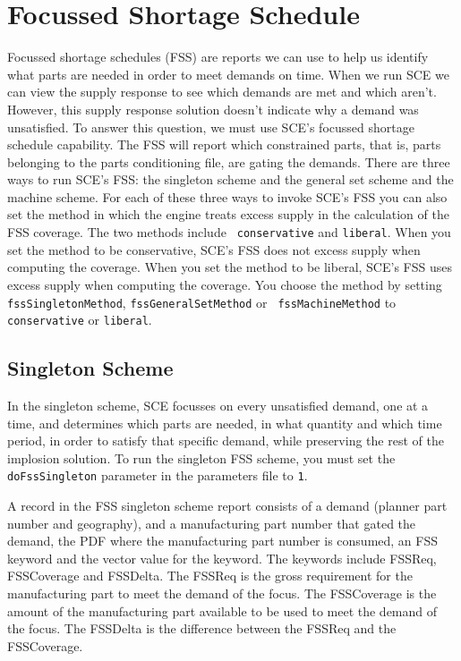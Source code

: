 \section{Focussed Shortage Schedule}
Focussed shortage schedules (FSS) are reports we can use to help us
identify what parts are needed in order to meet demands on time.  When
we run SCE we can view the supply response to see which demands are
met and which aren't.  However, this supply response solution doesn't
indicate why a demand was unsatisfied.  To answer this question, we
must use SCE's focussed shortage schedule capability.  The FSS will
report which constrained parts, that is, parts belonging to the parts
conditioning file, are gating the demands.  There are three ways to
run SCE's FSS: the singleton scheme and the general set scheme and the
machine scheme.  For each of these three ways to invoke SCE's FSS you
can also set the method in which the engine treats excess supply in
the calculation of the FSS coverage.  The two methods include {\tt
conservative} and {\tt liberal}.  When you set the method to be
conservative, SCE's FSS does not excess supply when computing the
coverage. When you set the method to be liberal, SCE's FSS uses excess
supply when computing the coverage.  You choose the method by setting
{\tt fssSingletonMethod}, {\tt fssGeneralSetMethod} or {\tt
fssMachineMethod} to {\tt conservative} or {\tt liberal}.

\subsection{Singleton Scheme}
In the singleton scheme, SCE focusses on every unsatisfied demand, one
at a time, and determines which parts are needed, in what quantity and
which time period, in order to satisfy that specific demand, while
preserving the rest of the implosion solution.  To run the singleton
FSS scheme, you must set the {\tt doFssSingleton} parameter in the
parameters file to {\tt 1}.

A record in the FSS singleton scheme report consists of a demand
(planner part number and geography), and a manufacturing part number
that gated the demand, the PDF where the manufacturing part number is
consumed, an FSS keyword and the vector value for the keyword.  The
keywords include FSSReq, FSSCoverage and FSSDelta.  The FSSReq is the
gross requirement for the manufacturing part to meet the demand of the
focus.  The FSSCoverage is the amount of the manufacturing part
available to be used to meet the demand of the focus.  The FSSDelta is
the difference between the FSSReq and the FSSCoverage.

